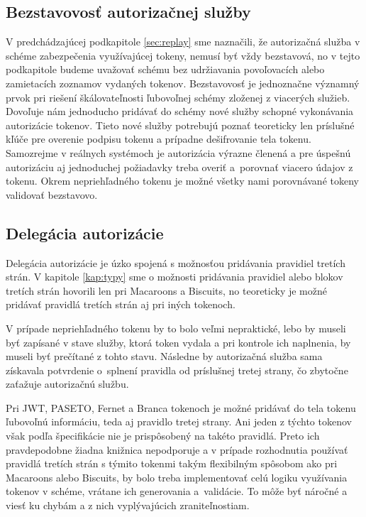 \subsection{Bezstavovosť autorizačnej služby}

V predchádzajúcej podkapitole \ref{sec:replay} sme naznačili, že autorizačná služba v schéme zabezpečenia využívajúcej tokeny, nemusí byť vždy bezstavová, no v tejto podkapitole budeme uvažovať schému bez udržiavania povoľovacích alebo zamietacích zoznamov vydaných tokenov. Bezstavovosť je jednoznačne významný prvok pri riešení škálovateľnosti ľubovoľnej schémy zloženej z viacerých služieb. Dovoľuje nám jednoducho pridávať do schémy nové služby schopné vykonávania autorizácie tokenov. Tieto nové služby potrebujú poznať teoreticky len príslušné kľúče pre overenie podpisu tokenu a prípadne dešifrovanie tela tokenu. Samozrejme v reálnych systémoch je autorizácia výrazne členená a pre úspešnú autorizáciu aj jednoduchej požiadavky treba overiť a~porovnať viacero údajov z tokenu. Okrem nepriehľadného tokenu je možné všetky nami porovnávané tokeny validovať bezstavovo.

\subsection{Delegácia autorizácie}

Delegácia autorizácie je úzko spojená s možnosťou pridávania pravidiel tretích strán. V kapitole \ref{kap:typy} sme o možnosti pridávania pravidiel alebo blokov tretích strán hovorili len pri Macaroons a Biscuits, no teoreticky je možné pridávať pravidlá tretích strán aj pri iných tokenoch. 

V prípade nepriehľadného tokenu by to bolo veľmi nepraktické, lebo by museli byť zapísané v stave služby, ktorá token vydala a pri kontrole ich naplnenia, by museli byť prečítané z tohto stavu. Následne by autorizačná služba sama získavala potvrdenie o~splnení pravidla od príslušnej tretej strany, čo zbytočne zaťažuje autorizačnú službu.

Pri JWT, PASETO, Fernet a Branca tokenoch je možné pridávať do tela tokenu ľubovoľnú informáciu, teda aj pravidlo tretej strany. Ani jeden z týchto tokenov však podľa špecifikácie nie je prispôsobený na takéto pravidlá. Preto ich pravdepodobne žiadna knižnica nepodporuje a v prípade rozhodnutia používať pravidlá tretích strán s týmito tokenmi takým flexibilným spôsobom ako pri Macaroons alebo Biscuits, by bolo treba implementovať celú logiku využívania tokenov v schéme, vrátane ich generovania a~validácie. To môže byť náročné a viesť ku chybám a z nich vyplývajúcich zraniteľnostiam.

